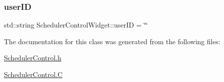 \mbox{\label{class_scheduler_control_widget_af73ee1b98fb7944ae193d5e880a59f31}} 
\subsubsection{\texorpdfstring{user\+ID}{userID}}
{\footnotesize\ttfamily std\+::string Scheduler\+Control\+Widget\+::user\+ID = \char`\"{}\char`\"{}\hspace{0.3cm}{\ttfamily [private]}}



The documentation for this class was generated from the following files\+:\begin{DoxyCompactItemize}
\item 
\hyperlink{_scheduler_control_8h}{Scheduler\+Control.\+h}\item 
\hyperlink{_scheduler_control_8_c}{Scheduler\+Control.\+C}\end{DoxyCompactItemize}
